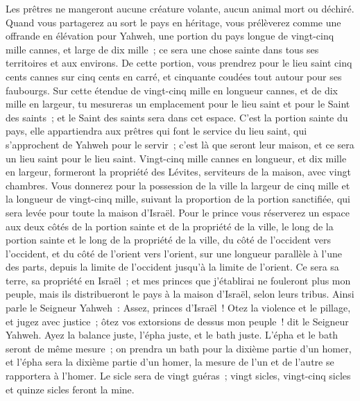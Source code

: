\begin{multicols}{2}
Les prêtres ne mangeront aucune créature volante, aucun animal mort ou déchiré.
\VerseOne{}Quand vous partagerez au sort le pays en héritage, vous prélèverez comme une offrande en élévation pour Yahweh, une portion du pays longue de vingt-cinq mille cannes, et large de dix mille~; ce sera une chose sainte dans tous ses territoires et aux environs.
De cette portion, vous prendrez pour le lieu saint cinq cents cannes sur cinq cents en carré, et cinquante coudées tout autour pour ses faubourgs.
Sur cette étendue de vingt-cinq mille en longueur cannes, et de dix mille en largeur, tu mesureras un emplacement pour le lieu saint et pour le Saint des saints~; et le Saint des saints sera dans cet espace.
C'est la portion sainte du pays, elle appartiendra aux prêtres qui font le service du lieu saint, qui s'approchent de Yahweh pour le servir~; c'est là que seront leur maison, et ce sera un lieu saint pour le lieu saint.
Vingt-cinq mille cannes en longueur, et dix mille en largeur, formeront la propriété des Lévites, serviteurs de la maison, avec vingt chambres.
Vous donnerez pour la possession de la ville la largeur de cinq mille et la longueur de vingt-cinq mille, suivant la proportion de la portion sanctifiée, qui sera levée pour toute la maison d'Israël.
Pour le prince vous réserverez un espace aux deux côtés de la portion sainte et de la propriété de la ville, le long de la portion sainte et le long de la propriété de la ville, du côté de l'occident vers l'occident, et du côté de l'orient vers l'orient, sur une longueur parallèle à l'une des parts, depuis la limite de l'occident jusqu'à la limite de l'orient.
Ce sera sa terre, sa propriété en Israël~; et mes princes que j'établirai ne fouleront plus mon peuple, mais ils distribueront le pays à la maison d'Israël, selon leurs tribus.
Ainsi parle le Seigneur Yahweh~: Assez, princes d'Israël~! Otez la violence et le pillage, et jugez avec justice~; ôtez vos extorsions de dessus mon peuple~! dit le Seigneur Yahweh.
Ayez la balance juste, l'épha juste, et le bath juste.
L'épha et le bath seront de même mesure~; on prendra un bath pour la dixième partie d'un homer, et l'épha sera la dixième partie d'un homer, la mesure de l'un et de l'autre se rapportera à l'homer.
Le sicle sera de vingt guéras~; vingt sicles, vingt-cinq sicles et quinze sicles feront la mine.

\end{multicols}
